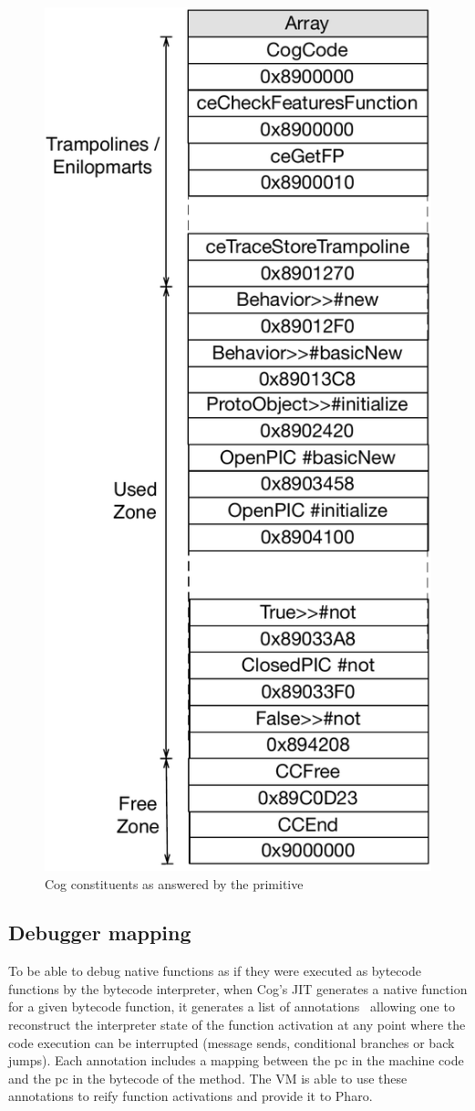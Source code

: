 \documentclass[10pt,nonatbib]{sigplanconf}
\newcommand{\figlabel}[1]{\label{fig:#1}}
\begin{document}
 \begin{figure}[b!]
     \begin{center}
         \includegraphics[width=0.66\linewidth]{ContentsOfCollectCogCodePrim}
         \caption{Cog constituents as answered by the primitive}
         \figlabel{fig:ContentsOfCollectCogCodePrim}
     \end{center}
 \end{figure}
 
\subsection{Debugger mapping}

To be able to debug native functions as if they were executed as bytecode functions by the bytecode interpreter, when Cog's JIT generates a native function for a given bytecode function, it generates a list of annotations~\cite{Ber16d} allowing one to reconstruct the interpreter state of the function activation at any point where the code execution can be interrupted (message sends, conditional branches or back jumps). Each annotation includes a mapping between the pc in the machine code and the pc in the bytecode of the method. The VM is able to use these annotations to reify function activations and provide it to Pharo.
 
\end{document}
